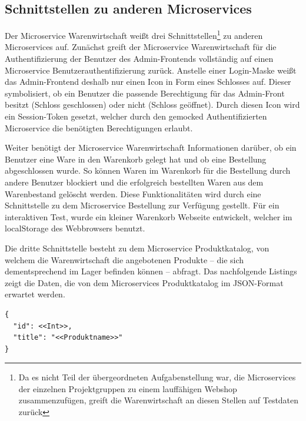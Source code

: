 \subsection{Schnittstellen zu anderen Microservices}
\label{subsec: Schnittstellen zu anderen Microservices}
Der Microservice Warenwirtschaft weißt drei Schnittstellen\footnote{Da es nicht Teil der übergeordneten Aufgabenstellung war, die Microservices der einzelnen Projektgruppen zu einem lauffähigen Webshop zusammenzufügen, greift die Warenwirtschaft an diesen Stellen auf Testdaten zurück} zu anderen Microservices auf. Zunächst greift der Microservice Warenwirtschaft für die Authentifizierung der Benutzer des Admin-Frontends vollständig auf einen Microservice Benutzerauthentifizierung zurück. Anstelle einer Login-Maske weißt das Admin-Frontend deshalb nur einen Icon in Form eines Schlosses auf. Dieser symbolisiert, ob ein Benutzer die passende Berechtigung für das Admin-Front besitzt (Schloss geschlossen) oder nicht (Schloss geöffnet).
Durch diesen Icon wird ein Session-Token gesetzt, welcher durch den gemocked Authentifizierten Microservice die benötigten Berechtigungen erlaubt.\par
Weiter benötigt der Microservice Warenwirtschaft Informationen darüber, ob ein Benutzer eine Ware in den Warenkorb gelegt hat und ob eine Bestellung abgeschlossen wurde. So können Waren im Warenkorb für die Bestellung durch andere Benutzer blockiert und die erfolgreich bestellten Waren aus dem Warenbestand gelöscht werden. Diese Funktionalitäten wird durch eine Schnittstelle zu dem Microservice Bestellung zur Verfügung gestellt. Für ein interaktiven Test, wurde ein kleiner Warenkorb Webseite entwickelt, welcher im localStorage des Webbrowsers benutzt.\par
Die dritte Schnittstelle besteht zu dem Microservice Produktkatalog, von welchem die Warenwirtschaft die angebotenen Produkte -- die sich dementsprechend im Lager befinden können -- abfragt. Das nachfolgende Listings zeigt die Daten, die von dem  Microservices Produktkatalog im JSON-Format erwartet werden.

\begin{lstlisting}[caption=Datenabfrage aus dem Produktkatalog]
{
  "id": <<Int>>,
  "title": "<<Produktname>>"
}
\end{lstlisting}


\newpage
